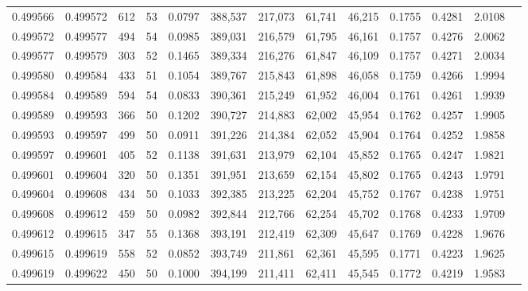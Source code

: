 \begin{tabular}{rrrrrrrrrrrrr}
0.499566 & 0.499572 & 612 &  53 &                                     0.0797 & 388,537 & 217,073 &  61,741 &  46,215 & 0.1755 & 0.4281 & 2.0108 \\
0.499572 & 0.499577 & 494 &  54 &                                     0.0985 & 389,031 & 216,579 &  61,795 &  46,161 & 0.1757 & 0.4276 & 2.0062 \\
0.499577 & 0.499579 & 303 &  52 &                                     0.1465 & 389,334 & 216,276 &  61,847 &  46,109 & 0.1757 & 0.4271 & 2.0034 \\
0.499580 & 0.499584 & 433 &  51 &                                     0.1054 & 389,767 & 215,843 &  61,898 &  46,058 & 0.1759 & 0.4266 & 1.9994 \\
0.499584 & 0.499589 & 594 &  54 &                                     0.0833 & 390,361 & 215,249 &  61,952 &  46,004 & 0.1761 & 0.4261 & 1.9939 \\
0.499589 & 0.499593 & 366 &  50 &                                     0.1202 & 390,727 & 214,883 &  62,002 &  45,954 & 0.1762 & 0.4257 & 1.9905 \\
0.499593 & 0.499597 & 499 &  50 &                                     0.0911 & 391,226 & 214,384 &  62,052 &  45,904 & 0.1764 & 0.4252 & 1.9858 \\
0.499597 & 0.499601 & 405 &  52 &                                     0.1138 & 391,631 & 213,979 &  62,104 &  45,852 & 0.1765 & 0.4247 & 1.9821 \\
0.499601 & 0.499604 & 320 &  50 &                                     0.1351 & 391,951 & 213,659 &  62,154 &  45,802 & 0.1765 & 0.4243 & 1.9791 \\
0.499604 & 0.499608 & 434 &  50 &                                     0.1033 & 392,385 & 213,225 &  62,204 &  45,752 & 0.1767 & 0.4238 & 1.9751 \\
0.499608 & 0.499612 & 459 &  50 &                                     0.0982 & 392,844 & 212,766 &  62,254 &  45,702 & 0.1768 & 0.4233 & 1.9709 \\
0.499612 & 0.499615 & 347 &  55 &                                     0.1368 & 393,191 & 212,419 &  62,309 &  45,647 & 0.1769 & 0.4228 & 1.9676 \\
0.499615 & 0.499619 & 558 &  52 &                                     0.0852 & 393,749 & 211,861 &  62,361 &  45,595 & 0.1771 & 0.4223 & 1.9625 \\
0.499619 & 0.499622 & 450 &  50 &                                     0.1000 & 394,199 & 211,411 &  62,411 &  45,545 & 0.1772 & 0.4219 & 1.9583 \\

\end{tabular}
